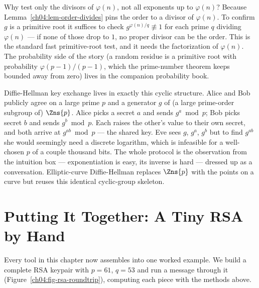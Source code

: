 \begin{connectionbox}
Why test only the divisors of $\varphi(n)$, not all exponents up to $\varphi(n)$? Because
Lemma~\ref{ch04:lem-order-divides} pins the order to a divisor of $\varphi(n)$. To confirm $g$ is a
primitive root it suffices to check $g^{\varphi(n)/q} \not\equiv 1$ for each prime $q$ dividing
$\varphi(n)$ --- if none of those drop to $1$, no proper divisor can be the order. This is the
standard fast primitive-root test, and it needs the factorization of $\varphi(n)$. The probability
side of the story (a random residue is a primitive root with probability $\varphi(p-1)/(p-1)$,
which the prime-number theorem keeps bounded away from zero) lives in the companion probability
book.
\end{connectionbox}

\begin{applicationbox}
Diffie-Hellman key exchange lives in exactly this cyclic structure. Alice and Bob publicly agree on
a large prime $p$ and a generator $g$ of (a large prime-order subgroup of) $\Zns{p}$. Alice picks a
secret $a$ and sends $g^a \bmod p$; Bob picks secret $b$ and sends $g^b \bmod p$. Each raises the
other's value to their own secret, and both arrive at $g^{ab} \bmod p$ --- the shared key. Eve sees
$g$, $g^a$, $g^b$ but to find $g^{ab}$ she would seemingly need a discrete logarithm, which is
infeasible for a well-chosen $p$ of a couple thousand bits. The whole protocol is the observation
from the intuition box --- exponentiation is easy, its inverse is hard --- dressed up as a
conversation. Elliptic-curve Diffie-Hellman replaces $\Zns{p}$ with the points on a curve but reuses
this identical cyclic-group skeleton.
\end{applicationbox}

\section{Putting It Together: A Tiny RSA by Hand}
\label{ch04:rsa-toy}

Every tool in this chapter now assembles into one worked example. We build a complete RSA keypair
with $p = 61$, $q = 53$ and run a message through it (Figure~\ref{ch04:fig-rsa-roundtrip}),
computing each piece with the methods above.

